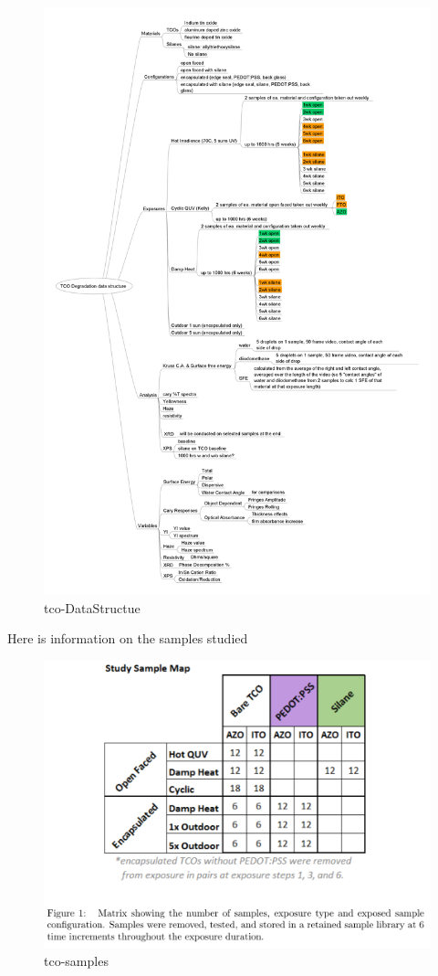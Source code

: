 \documentclass[
]{article}
\begin{document}
\begin{figure}
\centering
\includegraphics{./figs/tcoDataStructure.png}
\caption{tco-DataStructue}
\end{figure}

Here is information on the samples studied

\begin{figure}
\centering
\includegraphics{./figs/tco-samples.png}
\caption{tco-samples}
\end{figure}
\end{document}
